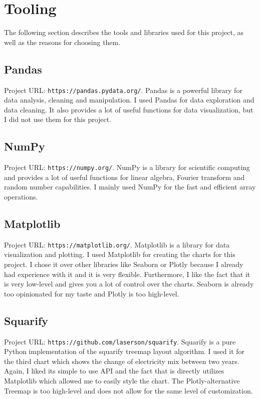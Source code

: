 \documentclass{article}
\begin{document}
\section{Tooling}

The following section describes the tools and libraries used for this project, as well as the reasons for choosing them.

\subsection{Pandas}
Project URL: \texttt{https://pandas.pydata.org/}.\newline
Pandas is a powerful library for data analysis, cleaning and manipulation.
I used Pandas for data exploration and data cleaning.
It also provides a lot of useful functions for data visualization, but I did not use them for this project.

\subsection{NumPy}
Project URL: \texttt{https://numpy.org/}.\newline
NumPy is a library for scientific computing and provides a lot of useful functions for linear algebra, Fourier transform and random number capabilities.
I mainly used NumPy for the fast and efficient array operations.

\subsection{Matplotlib}
Project URL: \texttt{https://matplotlib.org/}.\newline
Matplotlib is a library for data visualization and plotting.
I used Matplotlib for creating the charts for this project.
I chose it over other libraries like Seaborn or Plotly because I already had experience with it and it is very flexible.
Furthermore, I like the fact that it is very low-level and gives you a lot of control over the charts.
Seaborn is already too opinionated for my taste and Plotly is too high-level.

\subsection{Squarify}
Project URL: \texttt{https://github.com/laserson/squarify}.\newline
Squarify is a pure Python implementation of the squarify treemap layout algorithm.
I used it for the third chart which shows the change of electricity mix between two years.
Again, I liked its simple to use API and the fact that is directly utilizes Matplotlib which allowed me to easily style the chart.
The Plotly-alternative Treemap is too high-level and does not allow for the same level of customization.
\end{document}

